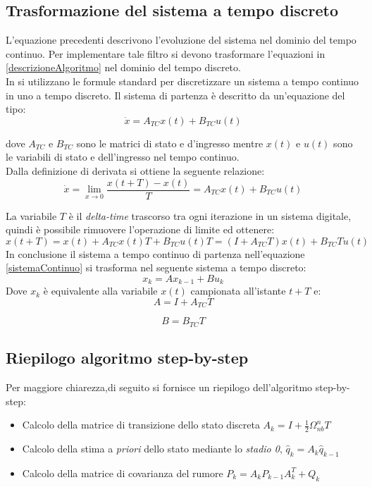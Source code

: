 \subsection{Trasformazione del sistema a tempo discreto}
L'equazione precedenti descrivono l'evoluzione del sistema nel dominio del tempo continuo. Per implementare tale filtro si devono trasformare l'equazioni in \ref{descrizioneAlgoritmo} nel dominio del tempo discreto. \\
In \cite{trackingThesis} si utilizzano le formule standard per discretizzare un sistema a tempo continuo in uno a tempo discreto. Il sistema di partenza è descritto da un'equazione del tipo:
\begin{equation}
\label{sistemaContinuo}
\dot{x}= A_{TC} x(t) + B_{TC} u(t)
\end{equation}

dove $A_{TC}$ e $B_{TC}$ sono le matrici di stato e d'ingresso mentre $x(t)$ e $u(t)$ sono le variabili di stato e dell'ingresso nel tempo continuo.\\
Dalla definizione di derivata si ottiene la seguente relazione:
\begin{equation}
\dot{x} = \lim\limits_{x\rightarrow0} \dfrac{x(t+T)-x(t)}{T} = A_{TC}x(t) + B_{TC}u(t)
\end{equation}

La variabile $T$ è il \textit{delta-time} trascorso tra ogni iterazione in un sistema digitale, quindi è possibile rimuovere l'operazione di limite ed ottenere:
\begin{equation}
x(t+T)=x(t)+ A_{TC}x(t)T + B_{TC}u(t)T = (I + A_{TC}T)x(t) + B_{TC}Tu(t)
\end{equation}
In conclusione il sistema a tempo continuo di partenza nell'equazione \ref{sistemaContinuo} si trasforma nel seguente sistema a tempo discreto:
\begin{equation}
x_k = A x_{k-1} + B u_k
\end{equation}
Dove $x_k$ è equivalente alla variabile $x(t)$ campionata all'istante $t + T$ e:
\begin{equation}
A = I + A_{TC}T
\end{equation}

\begin{equation}
B = B_{TC}T
\end{equation}

\subsection{Riepilogo algoritmo step-by-step}
Per maggiore chiarezza,di seguito si fornisce un riepilogo dell'algoritmo step-by-step:
\begin{itemize}
	\item Calcolo della matrice di transizione dello stato discreta $A_k= I + \frac{1}{2} \Omega_{nb}^n T$
	\item Calcolo della stima a \textit{priori} dello stato mediante lo \textit{stadio 0},  $\hat{q}_k = A_k\hat{q}_{k-1}$
	\item Calcolo della matrice di covarianza del rumore  $P_k = A_kP_{k-1}A_k^T + Q_k$
\end{itemize}

